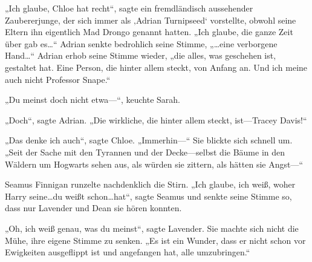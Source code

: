 „Ich glaube, Chloe hat recht“, sagte ein fremdländisch aussehender Zaubererjunge, der sich immer als ‚Adrian Turnipseed‘ vorstellte, obwohl seine Eltern ihn eigentlich Mad Drongo genannt hatten. „Ich glaube, die ganze Zeit über gab es…“ Adrian senkte bedrohlich seine Stimme, „…eine verborgene Hand…“ Adrian erhob seine Stimme wieder, „die alles, was geschehen ist, gestaltet hat. Eine Person, die hinter allem steckt, von Anfang an. Und ich meine auch nicht Professor Snape.“

„Du meinst doch nicht etwa—“, keuchte Sarah.

„Doch“, sagte Adrian. „Die wirkliche, die hinter allem steckt, ist—Tracey Davis!“

„Das denke ich auch“, sagte Chloe. „Immerhin—“ Sie blickte sich schnell um. „Seit der Sache mit den Tyrannen und der Decke—selbst die Bäume in den Wäldern um Hogwarts sehen aus, als würden sie zittern, als hätten sie Angst—“

Seamus Finnigan runzelte nachdenklich die Stirn. „Ich glaube, ich weiß, woher Harry seine…du weißt schon…hat“, sagte Seamus und senkte seine Stimme so, dass nur Lavender und Dean sie hören konnten.

„Oh, ich weiß genau, was du meinst“, sagte Lavender. Sie machte sich nicht die Mühe, ihre eigene Stimme zu senken. „Es ist ein Wunder, dass er nicht schon vor Ewigkeiten ausgeflippt ist und angefangen hat, alle umzubringen.“

